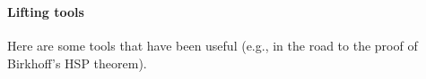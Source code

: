 \begin{code}
\AgdaSpace{}%
\AgdaSymbol{(}\AgdaSpace{}%
\AgdaSpace{}%
\AgdaSymbol{)}\AgdaSpace{}%
\AgdaSymbol{(}\AgdaSpace{}%
\AgdaSymbol{)}\AgdaSpace{}%
\AgdaSpace{}%
\AgdaSpace{}%
\AgdaSpace{}%
\AgdaSpace{}%
\AgdaSpace{}%
\AgdaSpace{}%
\AgdaSpace{}%
\<%
\\
%
\>[1]\AgdaSpace{}%
\AgdaSpace{}%
\AgdaSymbol{=}\AgdaSpace{}%
\AgdaSpace{}%
\AgdaSpace{}%
\AgdaSpace{}%
\AgdaSymbol{(}\AgdaSpace{}%
\AgdaSpace{}%
\AgdaSymbol{)}\AgdaSpace{}%
\AgdaFunction{,}\AgdaSpace{}%
\AgdaSymbol{(}\AgdaSpace{}%
\AgdaSpace{}%
\AgdaSymbol{)}\<%
\end{code}
\ccpad
\paragraph{Lifting tools}\label{lifting-tools}

Here are some tools that have been useful (e.g., in the road to the
proof of Birkhoff's HSP theorem).

